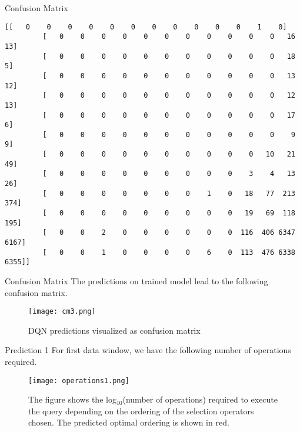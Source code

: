 \begin{frame}[fragile]{Confusion Matrix}
    \begin{lstlisting}[caption=Confusion matrix for DQN classificaiton, label={lst:confusion_matrix}]
        [[   0    0    0    0    0    0    0    0    0    0    0    1    0]
         [   0    0    0    0    0    0    0    0    0    0    0   16   13]
         [   0    0    0    0    0    0    0    0    0    0    0   18    5]
         [   0    0    0    0    0    0    0    0    0    0    0   13   12]
         [   0    0    0    0    0    0    0    0    0    0    0   12   13]
         [   0    0    0    0    0    0    0    0    0    0    0   17    6]
         [   0    0    0    0    0    0    0    0    0    0    0    9    9]
         [   0    0    0    0    0    0    0    0    0    0   10   21   49]
         [   0    0    0    0    0    0    0    0    0    3    4   13   26]
         [   0    0    0    0    0    0    0    1    0   18   77  213  374]
         [   0    0    0    0    0    0    0    0    0   19   69  118  195]
         [   0    0    2    0    0    0    0    0    0  116  406 6347 6167]
         [   0    0    1    0    0    0    0    6    0  113  476 6338 6355]]
    \end{lstlisting}
\end{frame}

\begin{frame}{Confusion Matrix}
    The predictions on trained model lead to the following confusion matrix.
    \begin{figure}
        \centering
        \texttt{[image: cm3.png]}\\
        \caption{DQN predictions visualized as confusion matrix}
        \label{fig:dqn_r2_1}
    \end{figure}
\end{frame}

\begin{frame}{Prediction 1}
    For first data window, we have the following number of operations required.
    \begin{figure}
        \centering
        \texttt{[image: operations1.png]}\\
        \caption{The figure shows the log$_{10}$(number of operations) required to execute the query depending on the ordering of the selection operators chosen. The predicted optimal ordering is shown in red.}
        \label{fig:operations1}
    \end{figure}
\end{frame}

